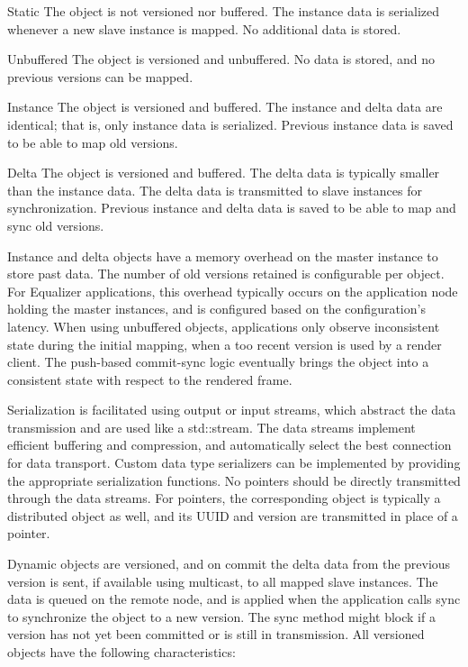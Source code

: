 \begin{compactdesc}
\item[Static] The object is not versioned nor buffered. The instance data is
  serialized whenever a new slave instance is mapped. No additional data is
  stored.
\item[Unbuffered] The object is versioned and unbuffered. No data is stored, and
  no previous versions can be mapped.
\item[Instance] The object is versioned and buffered. The instance and delta
  data are identical; that is, only instance data is serialized. Previous
  instance data is saved to be able to map old versions.
\item[Delta] The object is versioned and buffered. The delta data is typically
  smaller than the instance data. The delta data is transmitted to slave
  instances for synchronization. Previous instance and delta data is saved to be
  able to map and sync old versions.
\end{compactdesc}

Instance and delta objects have a memory overhead on the master instance to
store past data. The number of old versions retained is configurable per
object. For Equalizer applications, this overhead typically occurs on the
application node holding the master instances, and is configured based on the
configuration's latency. When using unbuffered objects, applications only
observe inconsistent state during the initial mapping, when a too recent
version is used by a render client. The push-based commit-sync logic eventually
brings the object into a consistent state with respect to the rendered frame.

Serialization is facilitated using output or input streams, which abstract the
data transmission and are used like a \textsf{std::stream}. The data streams
implement efficient buffering and compression, and automatically select the best
connection for data transport. Custom data type serializers can be implemented
by providing the appropriate serialization functions. No pointers should be
directly transmitted through the data streams. For pointers, the corresponding
object is typically a distributed object as well, and its UUID and version are
transmitted in place of a pointer.

Dynamic objects are versioned, and on \textsf{commit} the delta data from the
previous version is sent, if available using multicast, to all mapped slave
instances. The data is queued on the remote node, and is applied when the
application calls \textsf{sync} to synchronize the object to a new version. The
\textsf{sync} method might block if a version has not yet been committed or is
still in transmission. All versioned objects have the following characteristics:

